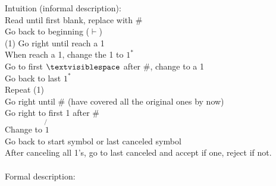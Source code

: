 \documentclass[11pt]{article}
\begin{document}
Intuition (informal description): \\
Read until first blank, replace with \# \\
Go back to beginning ($\vdash$) \\
(1) Go right until reach a 1 \\
\hspace*{8mm} When reach a 1, change the 1 to $1^*$ \\
\hspace*{8mm} Go to first $\textvisiblespace$ after \#, change to a 1 \\
\hspace*{8mm} Go back to last $1^*$ \\
\hspace*{8mm} Repeat (1) \\
Go right until \# (have covered all the original ones by now) \\
Go right to first 1 after \# \\
\hspace*{8mm} Change to $\not{1}$ \\
\hspace*{8mm} Go back to start symbol or last canceled symbol \\
After canceling all 1's, go to last canceled and accept if one, reject if not. \\
\\
Formal description: \\
\end{document}
